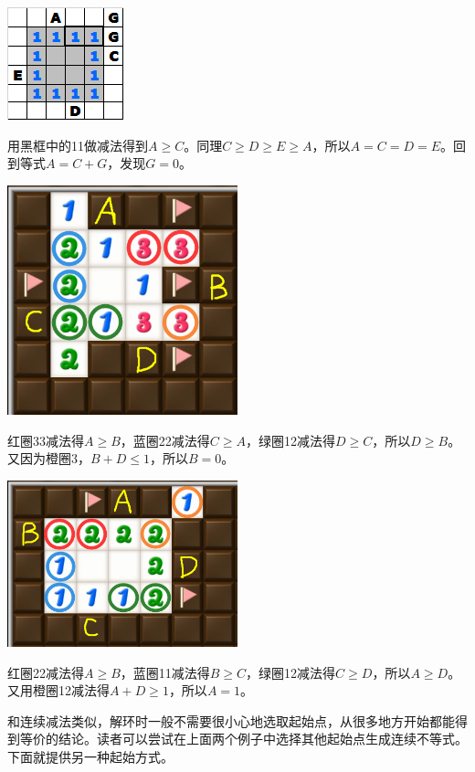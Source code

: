 \vspace{5mm}
\begin{center}
    \includegraphics{trick/环1.png}
\end{center}
用黑框中的11做减法得到$A\ge C$。同理$C\ge D\ge E\ge A$，所以$A=C=D=E$。回到等式$A=C+G$，发现$G=0$。

\vspace{5mm}
\begin{center}
    \includegraphics[width=0.5\textwidth]{trick/环2.png}
\end{center}
红圈33减法得$A\ge B$，蓝圈22减法得$C\ge A$，绿圈12减法得$D\ge C$，所以$D\ge B$。又因为橙圈3，$B+D\le 1$，所以$B=0$。

\vspace{5mm}
\begin{center}
    \includegraphics[width=0.5\textwidth]{trick/环3.png}
\end{center}
红圈22减法得$A\ge B$，蓝圈11减法得$B\ge C$，绿圈12减法得$C\ge D$，所以$A\ge D$。又用橙圈12减法得$A+D\ge 1$，所以$A=1$。

和连续减法类似，解环时一般不需要很小心地选取起始点，从很多地方开始都能得到等价的结论。读者可以尝试在上面两个例子中选择其他起始点生成连续不等式。下面就提供另一种起始方式。

